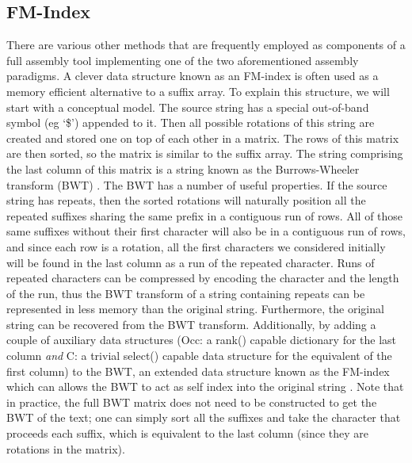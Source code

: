 \subsection{FM-Index}

There are various other methods that are frequently employed as components of a full assembly tool implementing one of the two aforementioned assembly paradigms.%
A clever data structure known as an FM-index is often used as a memory efficient alternative to a suffix array.
To explain this structure, we will start with a conceptual model.
The source string has a special out-of-band symbol (eg `\$') appended to it.
Then all possible rotations of this string are created and stored one on top of each other in a matrix.
The rows of this matrix are then sorted, so the matrix is similar to the suffix array.
The string comprising the last column of this matrix is a string known as the Burrows-Wheeler transform (BWT)  \cite{burrows1994block}.
The BWT has a number of useful properties.
If the source string has repeats, then the sorted rotations will naturally position all the repeated suffixes sharing the same prefix in a contiguous run of rows.
All of those same suffixes without their first character will also be in a contiguous run of rows, and since each row is a rotation, all the first characters we considered initially will be found in the last column as a run of the repeated character.
Runs of repeated characters can be compressed by encoding the character and the length of the run, thus the BWT transform of a string containing repeats can be represented in less memory than the original string.
Furthermore, the original string can be recovered from the BWT transform.
Additionally, by adding a couple of auxiliary data structures (Occ: a rank() capable dictionary for the last column \emph{and } C: a trivial select() capable data structure for the equivalent of the first column) to the BWT, an extended data structure known as the FM-index which can allows the BWT to act as self index into the original string \cite{ferragina2000opportunistic}.
Note that in practice, the full BWT matrix does not need to be constructed to get the BWT of the text; one can simply sort all the suffixes and take the character that proceeds each suffix, which is equivalent to the last column (since they are rotations in the matrix).  
